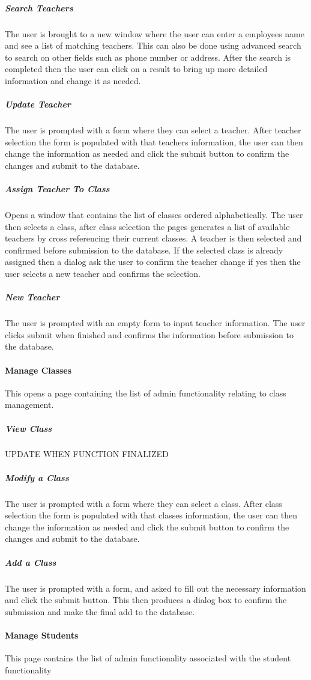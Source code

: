 \subparagraph{Search Teachers}
The user is brought to a new window where the user can enter a employees name and see a list of matching teachers. This can also be done using advanced search to search on other fields such as phone number or address. After the search is completed then the user can click on a result to bring up more detailed information and change it as needed. 

\subparagraph{Update Teacher}
The user is prompted with a form where they can select a teacher. After teacher selection the form is populated with that teachers information, the user can then change the information as needed and click the submit button to confirm the changes and submit to the database.

\subparagraph{Assign Teacher To Class}
Opens a window that contains the list of classes ordered alphabetically. The user then selects a class, after class selection the pages generates a list of available teachers by cross referencing their current classes. A teacher is then selected and confirmed before submission to the database. If the selected class is already assigned then a dialog ask the user to confirm the teacher change if yes then the user selects a new teacher and confirms the selection.

\subparagraph{New Teacher}
The user is prompted with an empty form to input teacher information. The user clicks submit when finished and confirms the information before submission to the database.

\paragraph{Manage Classes}
This opens a page containing the list of admin functionality relating to class management.

\subparagraph{View Class}
UPDATE WHEN FUNCTION FINALIZED

\subparagraph{Modify a Class}
The user is prompted with a form where they can select a class. After class selection the form is populated with that classes information, the user can then change the information as needed and click the submit button to confirm the changes and submit to the database.

\subparagraph{Add a Class}
The user is prompted with a form, and asked to fill out the necessary information and click the submit button. This then produces a dialog box to confirm the submission and make the final add to the database.

\paragraph{Manage Students}
This page contains the list of admin functionality associated with the student functionality

